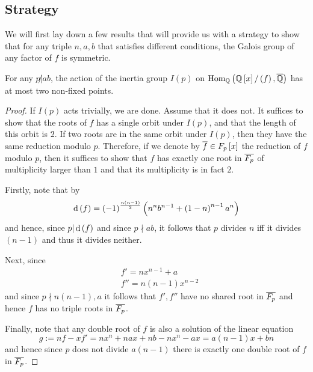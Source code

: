 \documentclass[../main.tex]{subfiles}
\begin{document}
\subsection{Strategy}
We will first lay down a few results that will provide us with a strategy to show that for any triple $n,a,b$ that satisfies different conditions, the Galois group of any factor of $f$ is symmetric.
\begin{lemma}
  \label{lem:inertia_group_acts_as_transposition_director}
  For any $p \not | ab$, the action of the inertia group $I\left( p \right)$ on $\operatorname{\rm Hom}_{\mathbb{Q}}\left( \mathbb{Q}\left[ x \right] / \left( f \right), \overline{\mathbb{Q}} \right)$ has at most two non-fixed points. 
\end{lemma}
\begin{proof}
  If $I\left( p \right)$ acts trivially, we are done.
  Assume that it does not.
  It suffices to show that the roots of $f$ has a single orbit under $I\left( p \right)$, and that the length of this orbit is $2$.
  If two roots are in the same orbit under $I\left( p \right)$, then they have the same reduction modulo $p$.
  Therefore, if we denote by $\overline{f} \in F_p\left[ x \right]$ the reduction of $f$ modulo $p$, then it suffices to show that $f$ has exactly one root in $\overline{F_p}$ of multiplicity larger than $1$ and that its multiplicity is in fact $2$.

  Firstly, note that by \cite[Theorem 2]{Swan62} 
  \[
    \operatorname{\rm d}\left( f \right) = 
    \left( -1 \right)^{\frac{n(n-1)}{2}} \left(  
      n^nb^{n-1} + \left( 1 - n \right)^{n - 1} a^n
    \right)
  \]
  and hence, since $p | \operatorname{\rm d}\left( f \right)$ and since $p \nmid ab$, it follows that $p$ divides $n$ iff it divides $\left( n-1 \right)$ and thus it divides neither.
  
  Next, since 
  \begin{align*}
    & f' = n x^{n-1} + a \\
    & f'' = n \left( n - 1 \right) x^{n-2}
  \end{align*}
  and since $p \nmid n \left( n - 1 \right), a$ it follows that $f', f''$ have no shared root in $\overline{F_p}$ and hence $f$ has no triple roots in $\overline{F_p}$.

  Finally, note that any double root of $f$ is also a solution of the linear equation
  \[
    g := 
    n f - x f' = 
    nx^n + n a x + n b - n x^n - a x = 
    a \left( n - 1 \right) x + b n
  \]
  and hence since $p$ does not divide $a \left( n - 1 \right)$ there is exactly one double root of $f$ in $\overline{F_p}$.
\end{proof}
\end{document}

